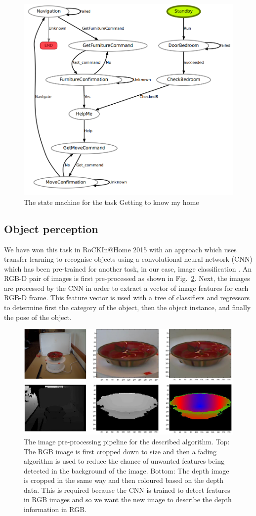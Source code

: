 \begin{figure}[!htb]
\centering
\includegraphics[width=3.in]{statemachine_t1.png}
\caption{The state machine for the task Getting to know my home}
\label{fig:st1}
\end{figure}

\subsection{Object perception} 

We have won this task in RoCKIn@Home 2015 with an approach which uses transfer learning to recognise objects using a convolutional neural network (CNN) which has been pre-trained for another task, in our case, image classification \cite{schwarz}. An RGB-D pair of images is first pre-processed as shown in Fig.~\ref{fig:object_perception}. Next, the images are processed by the CNN in order to extract a vector of image features for each RGB-D frame. This feature vector is used with a tree of classifiers and regressors to determine first the category of the object, then the object instance, and finally the pose of the object.

\begin{figure}[!htb]
\centering
\includegraphics[width=3.in]{object_perception.png}
\caption{The image pre-processing pipeline for the described algorithm. Top: The RGB image is first cropped down to size and then a fading algorithm is used to reduce the chance of unwanted features being detected in the background of the image. Bottom: The depth image is cropped in the same way and then coloured based on the depth data. This is required because the CNN is trained to detect features in RGB images and so we want the new image to describe the depth information in RGB.}
\label{fig:object_perception}
\end{figure}

